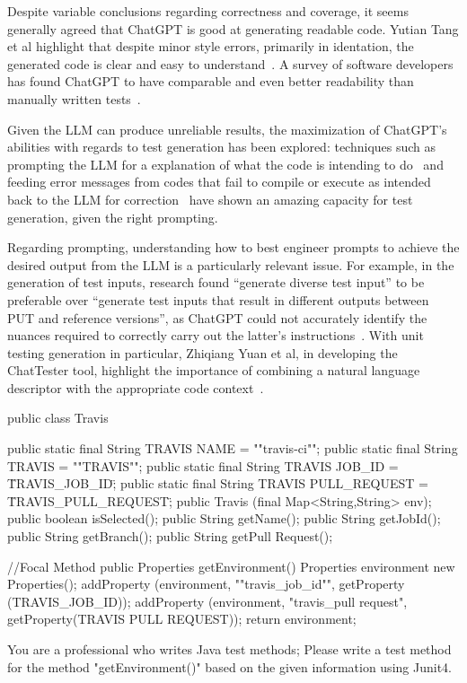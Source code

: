 Despite variable conclusions regarding correctness and coverage, it seems generally agreed that ChatGPT is good at generating readable code. Yutian Tang et al highlight that despite minor style errors, primarily in identation, the generated code is clear and easy to understand~\cite{kn:tang2023chatgpt}. A survey of software developers has found ChatGPT to have comparable and even better readability than manually written tests~\cite{kn:chattester}.


Given the LLM can produce unreliable results, the maximization of ChatGPT's abilities with regards to test generation has been explored: techniques such as prompting the LLM for a explanation of what the code is intending to do~\cite{kn:nuances} and feeding error messages from codes that fail to compile or execute as intended back to the LLM for correction~\cite{kn:chattester} have shown an amazing capacity for test generation, given the right prompting.

Regarding prompting, understanding how to best engineer prompts to achieve the desired output from the LLM is a particularly relevant issue. For example, in the generation of test inputs, research found ``generate diverse test input'' to be preferable over ``generate test inputs that result in different outputs between PUT and reference versions'', as ChatGPT could not accurately identify the nuances required to correctly carry out the latter's instructions~\cite{kn:nuances}.
With unit testing generation in particular, Zhiqiang Yuan et al, in developing the ChatTester tool, highlight the importance of combining a natural language descriptor with the appropriate code context~\cite{kn:chattester}.

\begin{prompt}
public class Travis {
public static final String TRAVIS NAME = ""travis-ci"";
public static final String TRAVIS = ""TRAVIS"";
public static final String TRAVIS JOB_ID = \"TRAVIS_JOB_ID\";
public static final String TRAVIS PULL_REQUEST = \"TRAVIS_PULL_REQUEST\";
public Travis (final Map<String,String> env);
public boolean isSelected();
public String getName();
public String getJobId();
public String getBranch();
public String getPull Request();

//Focal Method
public Properties getEnvironment() {
  Properties environment new Properties();
  addProperty (environment, ""travis_job_id"", getProperty (TRAVIS_JOB_ID));
  addProperty (environment, "travis_pull request", getProperty(TRAVIS PULL REQUEST));
  return environment;
  }
}

You are a professional who writes Java test methods;
Please write a test method for the method "getEnvironment()" based on the given information using Junit4.
\end{prompt}

